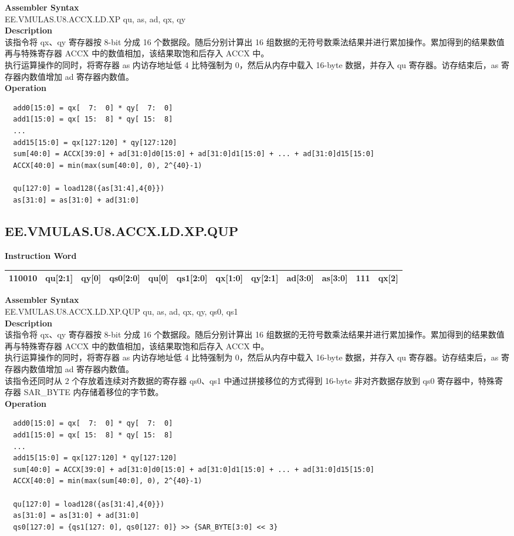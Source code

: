 \textbf{Assembler Syntax} \\
EE.VMULAS.U8.ACCX.LD.XP qu, as, ad, qx, qy \\
\textbf{Description} \\
该指令将 qx、qy 寄存器按 8-bit 分成 16 个数据段。随后分别计算出 16 组数据的无符号数乘法结果并进行累加操作。累加得到的结果数值再与特殊寄存器 ACCX 中的数值相加，该结果取饱和后存入 ACCX 中。\\
执行运算操作的同时，将寄存器 as 内访存地址低 4 比特强制为 0，然后从内存中载入 16-byte 数据，并存入 qu 寄存器。访存结束后，as 寄存器内数值增加 ad 寄存器内数值。\\
\textbf{Operation}
\begin{lstlisting}
  add0[15:0] = qx[  7:  0] * qy[  7:  0]
  add1[15:0] = qx[ 15:  8] * qy[ 15:  8]
  ...
  add15[15:0] = qx[127:120] * qy[127:120]
  sum[40:0] = ACCX[39:0] + ad[31:0]d0[15:0] + ad[31:0]d1[15:0] + ... + ad[31:0]d15[15:0]
  ACCX[40:0] = min(max(sum[40:0], 0), 2^{40}-1)

  qu[127:0] = load128({as[31:4],4{0}})
  as[31:0] = as[31:0] + ad[31:0]
\end{lstlisting}

\clearpage
\subsection{EE.VMULAS.U8.ACCX.LD.XP.QUP}\label{instruction:EEVMULASU8ACCXLDXPQUP}
\setlength\tabcolsep{6pt}
\textbf{Instruction Word} \\
\begin{tabular}{|c|c|c|c|c|c|c|c|c|c|c|c|}
	\hline
	110010 & qu[2:1] & qy[0] & qs0[2:0] & qu[0] & qs1[2:0] & qx[1:0] & qy[2:1] & ad[3:0] & as[3:0] & 111 & qx[2] \\
	\hline
\end{tabular}

\textbf{Assembler Syntax} \\
EE.VMULAS.U8.ACCX.LD.XP.QUP qu, as, ad, qx, qy, qs0, qs1 \\
\textbf{Description} \\
该指令将 qx、qy 寄存器按 8-bit 分成 16 个数据段。随后分别计算出 16 组数据的无符号数乘法结果并进行累加操作。累加得到的结果数值再与特殊寄存器 ACCX 中的数值相加，该结果取饱和后存入 ACCX 中。\\
执行运算操作的同时，将寄存器 as 内访存地址低 4 比特强制为 0，然后从内存中载入 16-byte 数据，并存入 qu 寄存器。访存结束后，as 寄存器内数值增加 ad 寄存器内数值。\\
该指令还同时从 2 个存放着连续对齐数据的寄存器 qs0、qs1 中通过拼接移位的方式得到 16-byte 非对齐数据存放到 qs0 寄存器中，特殊寄存器 SAR\_BYTE 内存储着移位的字节数。\\
\textbf{Operation}
\begin{lstlisting}
  add0[15:0] = qx[  7:  0] * qy[  7:  0]
  add1[15:0] = qx[ 15:  8] * qy[ 15:  8]
  ...
  add15[15:0] = qx[127:120] * qy[127:120]
  sum[40:0] = ACCX[39:0] + ad[31:0]d0[15:0] + ad[31:0]d1[15:0] + ... + ad[31:0]d15[15:0]
  ACCX[40:0] = min(max(sum[40:0], 0), 2^{40}-1)

  qu[127:0] = load128({as[31:4],4{0}})
  as[31:0] = as[31:0] + ad[31:0]
  qs0[127:0] = {qs1[127: 0], qs0[127: 0]} >> {SAR_BYTE[3:0] << 3}
\end{lstlisting}

